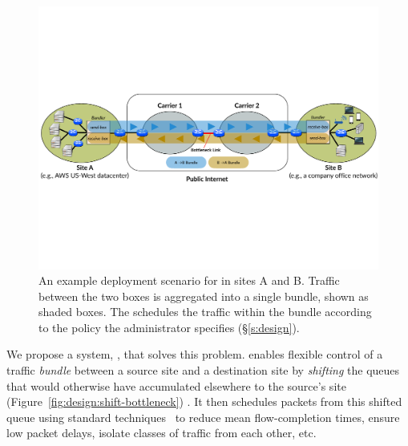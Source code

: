 
\begin{figure}[ht!]
    \centering
    \includegraphics[width=\textwidth]{img/deployment-arch.pdf}
    \caption{An example deployment scenario for \name in sites A and B.
    Traffic between the two boxes is aggregated into a single bundle, shown as shaded boxes. The \inbox schedules the traffic within the bundle according to the policy the administrator specifies (\S\ref{s:design}).
    }
    \label{fig:deploy:arch}
\end{figure}


We propose a system, {\em \name}, that solves this problem. \name enables flexible control of a traffic {\em bundle} between a source site and a destination site by {\em shifting} the queues that would otherwise have accumulated elsewhere to the source's site (Figure~\ref{fig:design:shift-bottleneck}) . It then schedules packets from this shifted queue using standard techniques~\cite{diffserv, fair-queueing, sfq, pie, CoDel, fifoplus, virtualClocks, csfq, drr, red, ecn} to reduce mean flow-completion times, ensure low packet delays, isolate classes of traffic from each other, etc.


